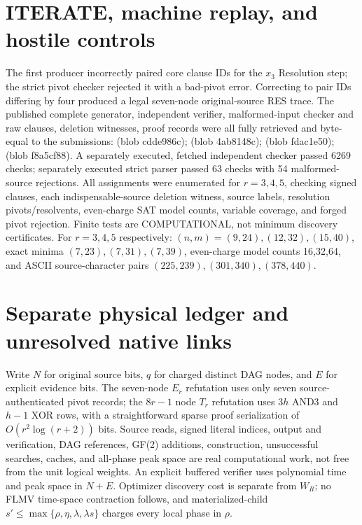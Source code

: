 \documentclass{article}
\begin{document}
\section*{ITERATE, machine replay, and hostile controls}
The first producer incorrectly paired core clause IDs for the $x_3$ Resolution step; the strict pivot checker rejected it with a bad-pivot error. Correcting to pair IDs differing by four produced a legal seven-node original-source RES trace. The published complete generator, independent verifier, malformed-input checker and raw clauses, deletion witnesses, proof records were all fully retrieved and byte-equal to the submissions:
 (blob cdde986c);
 (blob 4ab8148c);
 (blob fdac1e50);
 (blob f8a5cf88).
A separately executed, fetched independent checker passed 6269 checks; separately executed strict parser passed 63 checks with 54 malformed-source rejections. All assignments were enumerated for $r=3,4,5$, checking signed clauses, each indispensable-source deletion witness, source labels, resolution pivots/resolvents, even-charge SAT model counts, variable coverage, and forged pivot rejection. Finite tests are COMPUTATIONAL, not minimum discovery certificates. For $r=3,4,5$ respectively: $(n,m)=(9,24),(12,32),(15,40)$, exact minima $(7,23),(7,31),(7,39)$, even-charge model counts 16,32,64, and ASCII source-character pairs $(225,239),(301,340),(378,440)$.

\section*{Separate physical ledger and unresolved native links}
Write $N$ for original source bits, $q$ for charged distinct DAG nodes, and $E$ for explicit evidence bits. The seven-node $E_r$ refutation uses only seven source-authenticated pivot records; the $8r-1$ node $T_r$ refutation uses $3h$ AND3 and $h-1$ XOR rows, with a straightforward sparse proof serialization of $O(r^2\log(r+2))$ bits. Source reads, signed literal indices, output and verification, DAG references, GF(2) additions, construction, unsuccessful searches, caches, and all-phase peak space are real computational work, not free from the unit logical weights. An explicit buffered verifier uses polynomial time and peak space in $N+E$. Optimizer discovery cost is separate from $W_R$; no FLMV time-space contraction follows, and materialized-child $s'\le\max\{\rho,\eta,\lambda,\lambda s\}$ charges every local phase in $\rho$.
\end{document}
